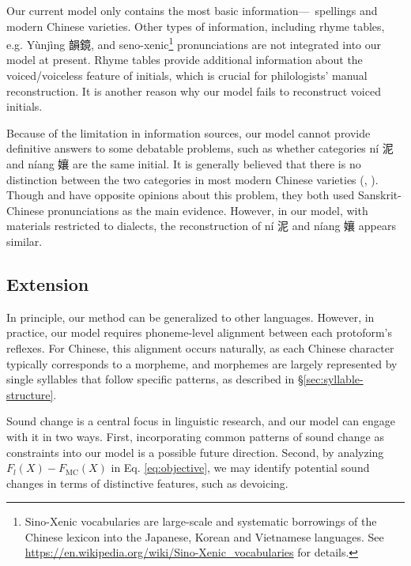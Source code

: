 Our current model only contains the most basic information---\fq~spellings and modern Chinese varieties. 
Other types of information, including rhyme tables, e.g. Y\`unj\`ing 韻鏡, and seno-xenic\footnote{Sino-Xenic vocabularies are large-scale and systematic borrowings of the Chinese lexicon into the Japanese, Korean and Vietnamese languages. See \url{https://en.wikipedia.org/wiki/Sino-Xenic_vocabularies} for details.} pronunciations are not integrated into our model at present. 
Rhyme tables provide additional information about the voiced/voiceless feature of initials, which is crucial for philologists' manual reconstruction. 
It is another reason why our model fails to reconstruct voiced initials.

Because of the limitation in information sources, our model cannot provide definitive answers to some debatable problems, such as 
    whether categories n\'i 泥 and n\'iang 孃 are the same initial. 
It is generally believed that there is no distinction between the two categories in most modern Chinese varieties (\citealp[p.228]{Tseng-ni-niang}, \citealp[p.126]{lr-1956}).
Though \citet[pp.125--126]{lr-1956} and \citet[pp.98--101]{shaorongfen} have opposite opinions about this problem, they both used Sanskrit-Chinese pronunciations as the main evidence. 
However, in our model, with materials restricted to dialects, the reconstruction of n\'i 泥 and n\'iang 孃 appears similar.

\subsection{Extension}
In principle, our method can be generalized to other languages. However, in practice, our model requires phoneme-level alignment between each protoform's reflexes. 
For Chinese, this alignment occurs naturally, as each Chinese character typically corresponds to a morpheme, and morphemes are largely represented by single syllables that follow specific patterns, as described in \S\ref{sec:syllable-structure}.

Sound change is a central focus in linguistic research, and our model can engage with it in two ways.
First, incorporating common patterns of sound change as constraints into our model is a possible future direction. 
Second, by analyzing $F_{l}(X)-F_{\text{MC}}(X)$ in Eq. \ref{eq:objective}, we may identify potential sound changes in terms of distinctive features, such as devoicing.
